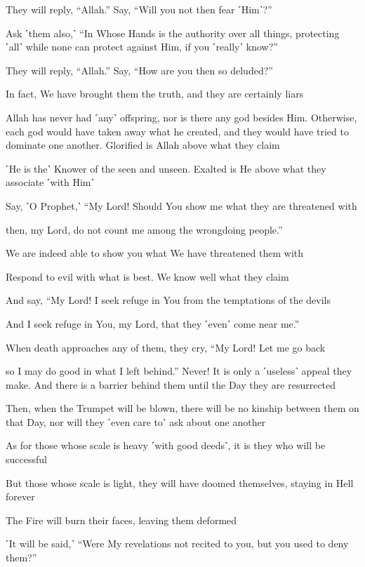 They will reply, “Allah.” Say, “Will you not then fear ˹Him˺?”

Ask ˹them also,˺ “In Whose Hands is the authority over all things, protecting ˹all˺ while none can protect against Him, if you ˹really˺ know?”

They will reply, “Allah.” Say, “How are you then so deluded?”

In fact, We have brought them the truth, and they are certainly liars

Allah has never had ˹any˺ offspring, nor is there any god besides Him. Otherwise, each god would have taken away what he created, and they would have tried to dominate one another. Glorified is Allah above what they claim

˹He is the˺ Knower of the seen and unseen. Exalted is He above what they associate ˹with Him˺

Say, ˹O Prophet,˺ “My Lord! Should You show me what they are threatened with

then, my Lord, do not count me among the wrongdoing people.”

We are indeed able to show you what We have threatened them with

Respond to evil with what is best. We know well what they claim

And say, “My Lord! I seek refuge in You from the temptations of the devils

And I seek refuge in You, my Lord, that they ˹even˺ come near me.”

When death approaches any of them, they cry, “My Lord! Let me go back

so I may do good in what I left behind.” Never! It is only a ˹useless˺ appeal they make. And there is a barrier behind them until the Day they are resurrected

Then, when the Trumpet will be blown, there will be no kinship between them on that Day, nor will they ˹even care to˺ ask about one another

As for those whose scale is heavy ˹with good deeds˺, it is they who will be successful

But those whose scale is light, they will have doomed themselves, staying in Hell forever

The Fire will burn their faces, leaving them deformed

˹It will be said,˺ “Were My revelations not recited to you, but you used to deny them?”

